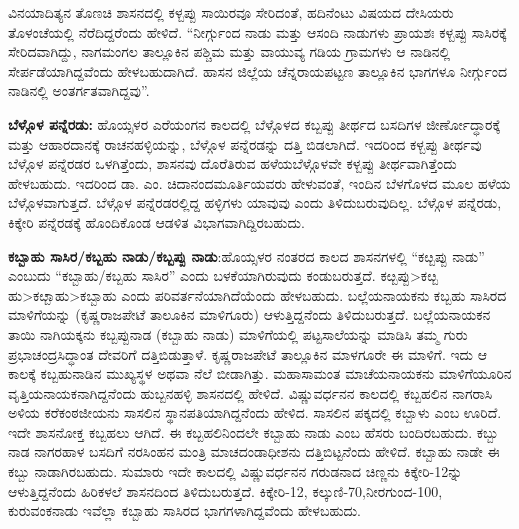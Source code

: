 ವಿನಯಾದಿತ್ಯನ ತೊಣಚಿ ಶಾಸನದಲ್ಲಿ ಕಳ್ಬಪ್ಪು ಸಾಯಿರವೂ ಸೇರಿದಂತೆ, ಹದಿನೆಂಟು ವಿಷಯದ ದೇಸಿಯರು ತೊಳಂಚೆಯಲ್ಲಿ ನೆರೆದಿದ್ದರೆಂದು ಹೇಳಿದೆ. “ನೀರ್ಗ್ಗುಂದ ನಾಡು ಮತ್ತು ಆಸಂದಿ ನಾಡುಗಳು ಪ್ರಾಯಶಃ ಕಳ್ಬಪ್ಪು ಸಾಸಿರಕ್ಕೆ ಸೇರಿದವಾಗಿದ್ದು, ನಾಗಮಂಗಲ ತಾಲ್ಲೂಕಿನ ಪಶ್ಚಿಮ ಮತ್ತು ವಾಯುವ್ಯ ಗಡಿಯ ಗ್ರಾಮಗಳು ಆ ನಾಡಿನಲ್ಲಿ ಸೇರ್ಪಡೆಯಾಗಿದ್ದವೆಂದು ಹೇಳಬಹುದಾಗಿದೆ. ಹಾಸನ ಜಿಲ್ಲೆಯ ಚೆನ್ನರಾಯಪಟ್ಟಣ ತಾಲ್ಲೂಕಿನ ಭಾಗಗಳೂ ನೀರ್ಗ್ಗುಂದ ನಾಡಿನಲ್ಲಿ ಅಂತರ್ಗತ\-ವಾಗಿದ್ದವು”.

\textbf{ಬೆಳ್ಗೊಳ ಪನ್ನೆರಡು:} ಹೊಯ್ಸಳರ ಎರೆಯಂಗನ ಕಾಲದಲ್ಲಿ ಬೆಳ್ಗೊಳದ ಕಬ್ಬಪ್ಪು ತೀರ್ಥದ ಬಸದಿಗಳ ಜೀರ್ಣೋದ್ಧಾರಕ್ಕೆ ಮತ್ತು ಆಹಾರದಾನಕ್ಕೆ ರಾಚನಹಳ್ಳಿಯನ್ನು, ಬೆಳ್ಗೊಳ ಪನ್ನೆರಡನ್ನು ದತ್ತಿ ಬಿಡಲಾಗಿದೆ. ಇದರಿಂದ ಕಳ್ಬಪ್ಪು ತೀರ್ಥವು ಬೆಳ್ಗೊಳ ಪನ್ನೆರಡರ ಒಳಗಿತ್ತೆಂದು, ಶಾಸನವು ದೊರೆತಿರುವ ಹಳೆಯಬೆಳ್ಗೊಳವೇ ಕಳ್ಬಪ್ಪು ತೀರ್ಥವಾಗಿತ್ತೆಂದು ಹೇಳಬಹುದು. ಇದರಿಂದ ಡಾ. ಎಂ. ಚಿದಾನಂದಮೂರ್ತಿಯವರು ಹೇಳುವಂತೆ, ಇಂದಿನ ಬೆಳಗೊಳದ ಮೂಲ ಹಳೆಯ ಬೆಳ್ಗೊಳವಾಗುತ್ತದೆ. ಬೆಳ್ಗೊಳ ಪನ್ನೆರಡರಲ್ಲಿದ್ದ ಹಳ್ಳಿಗಳು ಯಾವುವು ಎಂದು ತಿಳಿದುಬರುವುದಿಲ್ಲ. ಬೆಳ್ಗೊಳ ಪನ್ನೆರಡು, ಕಿಕ್ಕೇರಿ ಪನ್ನೆರಡಕ್ಕೆ ಹೊಂದಿಕೊಂಡ ಆಡಳಿತ ವಿಭಾಗವಾಗಿದ್ದಿರಬಹುದು.

\textbf{ಕಬ್ಬಾಹು ಸಾಸಿರ/ಕಬ್ಬಹು ನಾಡು/ಕಬ್ಬಪ್ಪು ನಾಡು}:ಹೊಯ್ಸಳರ ನಂತರದ ಕಾಲದ ಶಾಸನಗಳಲ್ಲಿ “ಕೞ್ಬಪ್ಪು ನಾಡು” ಎಂಬುದು “ಕಬ್ಬಾಹು/ಕಬ್ಬಹು ಸಾಸಿರ” ಎಂದು ಬಳಕೆಯಾಗಿರುವುದು ಕಂಡುಬರುತ್ತದೆ. ಕೞ್ಬಪ್ಪು\textgreater  ಕೞ್ಬ ಹು\textgreater ಕೞ್ಬಾಹು\textgreater ಕಬ್ಬಾಹು ಎಂದು ಪರಿವರ್ತನೆಯಾಗಿದೆಯೆಂದು ಹೇಳಬಹುದು. ಬಲ್ಲೆಯನಾಯಕನು ಕಬ್ಬಹು ಸಾಸಿರದ ಮಾಳಿಗೆಯನ್ನು (ಕೃಷ್ಣರಾಜಪೇಟೆ ತಾಲೂಕಿನ ಮಾಳಿಗೂರು) ಆಳುತ್ತಿದ್ದನೆಂದು ತಿಳಿದುಬರುತ್ತದೆ. ಬಲ್ಲೆಯನಾಯಕನ ತಾಯಿ ನಾಗಿಯಕ್ಕನು ಕಬ್ಬಪ್ಪುನಾಡ (ಕಬ್ಬಾಹು ನಾಡು) ಮಾಳಿಗೆಯಲ್ಲಿ ಪಟ್ಟಸಾಲೆಯನ್ನು ಮಾಡಿಸಿ ತಮ್ಮ ಗುರು ಪ್ರಭಾಚಂದ್ರಸಿದ್ಧಾಂತ ದೇವರಿಗೆ ದತ್ತಿಬಿಡುತ್ತಾಳೆ. ಕೃಷ್ಣರಾಜಪೇಟೆ ತಾಲ್ಲೂಕಿನ ಮಾಳಗೂರೇ ಈ ಮಾಳಿಗೆ. ಇದು ಆ ಕಾಲಕ್ಕೆ ಕಬ್ಬಹುನಾಡಿನ ಮುಖ್ಯಸ್ಥಳ ಅಥವಾ ನೆಲೆ ಬೀಡಾಗಿತ್ತು.\- ಮಹಾಸಾಮಂತ ಮಾಚೆಯನಾಯಕನು ಮಾಳಿಗೆಯೂರಿನ ವೃತ್ತಿಯನಾಯಕನಾಗಿದ್ದನೆಂದು ಹುಬ್ಬನಹಳ್ಳಿ ಶಾಸನದಲ್ಲಿ ಹೇಳಿದೆ. ವಿಷ್ಣುವರ್ಧನನ ಕಾಲದಲ್ಲಿ ಕಬ್ಬಹಲಿನ ನಾಗರಾಸಿ ಅಳಿಯ ಕರೆಕಂಠಜೀಯನು ಸಾಸಲಿನ ಸ್ಥಾನಪತಿಯಾಗಿದ್ದನೆಂದು ಹೇಳಿದ. ಸಾಸಲಿನ ಪಕ್ಕದಲ್ಲಿ ಕಬ್ಬಾಳು ಎಂಬ ಊರಿದೆ. ಇದೇ ಶಾಸನೋಕ್ತ ಕಬ್ಬಹಲು ಆಗಿದೆ. ಈ ಕಬ್ಬಹಲಿನಿಂದಲೇ ಕಬ್ಬಾಹು ನಾಡು ಎಂಬ ಹೆಸರು ಬಂದಿರಬಹುದು. ಕಬ್ಬು ನಾಡ ನಾಗರಹಾಳ ಬಸದಿಗೆ ನರಸಿಂಹನ ಮಂತ್ರಿ ಮಾಚದಂಡಾಧೀಶನು ದತ್ತಿಬಿಟ್ಟನೆಂದು ಹೇಳಿದೆ. ಕಬ್ಬಾಹು ನಾಡೇ ಈ ಕಬ್ಬು ನಾಡಾಗಿರಬಹುದು. ಸುಮಾರು ಇದೇ ಕಾಲದಲ್ಲಿ ವಿಷ್ಣುವರ್ಧನನ ಗರುಡನಾದ ಚಿಣ್ಣನು ಕಿಕ್ಕೇರಿ-12ನ್ನು ಆಳುತ್ತಿದ್ದನೆಂದು ಹಿರಿಕಳಲೆ ಶಾಸನದಿಂದ ತಿಳಿದುಬರುತ್ತದೆ. ಕಿಕ್ಕೇರಿ-12, ಕಲ್ಕುಣಿ-70,\break ನೀರಗುಂದ-100, ಕುರುವಂಕನಾಡು ಇವೆಲ್ಲಾ ಕಬ್ಬಾಹು ಸಾಸಿರದ ಭಾಗಗಳಾಗಿದ್ದವೆಂದು ಹೇಳಬಹುದು.

